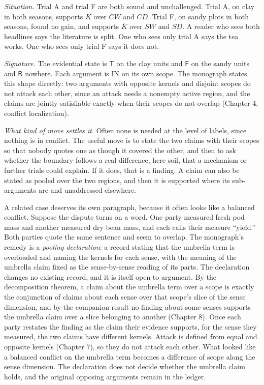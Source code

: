 \documentclass[11pt]{article}
\newcommand{\IN}{\textsf{IN}}
\begin{document}
\emph{Situation.} Trial A and trial F are both sound and unchallenged. Trial A, on clay in both seasons, supports $K$ over $CW$ and $CD$. Trial F, on sandy plots in both seasons, found no gain, and supports $\bar K$ over $SW$ and $SD$. A reader who sees both headlines says the literature is split. One who sees only trial A says the tea works. One who sees only trial F says it does not.

\emph{Signature.} The evidential state is $\mathsf T$ on the clay units and $\mathsf F$ on the sandy units and $\mathsf B$ nowhere. Each argument is \IN{} on its own scope. The monograph states this shape directly: two arguments with opposite kernels and disjoint scopes do not attack each other, since an attack needs a nonempty active region, and the claims are jointly satisfiable exactly when their scopes do not overlap (Chapter 4, conflict localization).

\emph{What kind of move settles it.} Often none is needed at the level of labels, since nothing is in conflict. The useful move is to state the two claims with their scopes so that nobody quotes one as though it covered the other, and then to ask whether the boundary follows a real difference, here soil, that a mechanism or further trials could explain. If it does, that is a finding. A claim can also be stated as pooled over the two regions, and then it is supported where its sub-arguments are and unaddressed elsewhere.

A related case deserves its own paragraph, because it often looks like a balanced conflict. Suppose the dispute turns on a word. One party measured fresh pod mass and another measured dry bean mass, and each calls their measure ``yield.'' Both parties quote the same sentence and seem to overlap. The monograph's remedy is a \emph{pooling declaration}: a record stating that the umbrella term is overloaded and naming the kernels for each sense, with the meaning of the umbrella claim fixed as the sense-by-sense reading of its parts. The declaration changes no existing record, and it is itself open to argument. By the decomposition theorem, a claim about the umbrella term over a scope is exactly the conjunction of claims about each sense over that scope's slice of the sense dimension, and by the companion result no finding about some senses supports the umbrella claim over a slice belonging to another (Chapter 8). Once each party restates the finding as the claim their evidence supports, for the sense they measured, the two claims have different kernels. Attack is defined from equal and opposite kernels (Chapter 7), so they do not attack each other. What looked like a balanced conflict on the umbrella term becomes a difference of scope along the sense dimension. The declaration does not decide whether the umbrella claim holds, and the original opposing arguments remain in the ledger.
\end{document}
